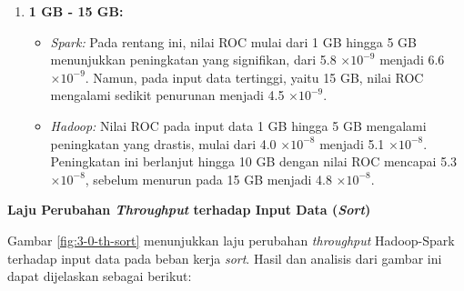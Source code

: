\begin{enumerate}
\item \textbf{1 GB - 15 GB:}
\begin{itemize}
    \item \textit{Spark:} Pada rentang ini, nilai ROC mulai dari 1 GB hingga 5 GB menunjukkan peningkatan yang signifikan, dari 5.8 $\times 10^{-9}$ menjadi 6.6 $\times 10^{-9}$. Namun, pada input data tertinggi, yaitu 15 GB, nilai ROC mengalami sedikit penurunan menjadi 4.5 $\times 10^{-9}$.
    \item \textit{Hadoop:} Nilai ROC pada input data 1 GB hingga 5 GB mengalami peningkatan yang drastis, mulai dari 4.0 $\times 10^{-8}$ menjadi 5.1 $\times 10^{-8}$. Peningkatan ini berlanjut hingga 10 GB dengan nilai ROC mencapai 5.3 $\times 10^{-8}$, sebelum menurun pada 15 GB menjadi 4.8 $\times 10^{-8}$.\\
\end{itemize}
\end{enumerate}

\textbf{Laju Perubahan \textit{Throughput} terhadap Input Data (\textit{Sort})}

Gambar \ref{fig:3-0-th-sort} menunjukkan laju perubahan \textit{throughput} Hadoop-Spark terhadap input data pada beban kerja \textit{sort}. Hasil dan analisis dari gambar ini dapat dijelaskan sebagai berikut:


